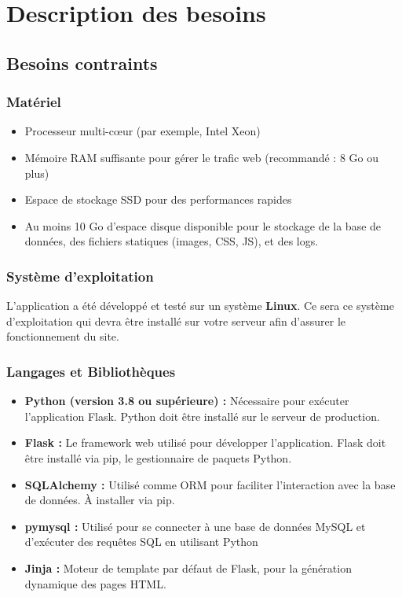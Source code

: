 \chapter{Description des besoins}

\section{Besoins contraints}

\subsection{Matériel}

\begin{itemize}
	\item Processeur multi-cœur (par exemple, Intel Xeon)
	\item Mémoire RAM suffisante pour gérer le trafic web (recommandé : 8 Go ou plus)
	\item Espace de stockage SSD pour des performances rapides
	\item Au moins 10 Go d'espace disque disponible pour le stockage de la base de données, des fichiers statiques (images, CSS, JS), et des logs.
	
\end{itemize}

\subsection{Système d'exploitation}

L'application a été développé et testé sur un système \textbf{Linux}. Ce sera ce système d'exploitation qui devra être installé sur votre serveur afin d'assurer le fonctionnement du site.

\subsection{Langages et Bibliothèques}

\begin{itemize}
	\item \textbf{Python (version 3.8 ou supérieure) :} Nécessaire pour exécuter l'application Flask. Python doit être installé sur le serveur de production.
	\item \textbf{Flask :} Le framework web utilisé pour développer l'application. Flask doit être installé via pip, le gestionnaire de paquets Python.
	\item \textbf{SQLAlchemy :} Utilisé comme ORM pour faciliter l'interaction avec la base de données. À installer via pip.
	\item \textbf{pymysql :} Utilisé pour se connecter à une base de données MySQL et d'exécuter des requêtes SQL en utilisant Python
	\item \textbf{Jinja :} Moteur de template par défaut de Flask, pour la génération dynamique des pages HTML.
\end{itemize}

